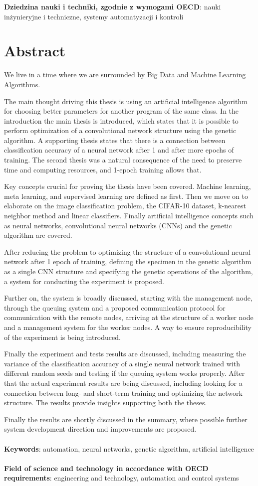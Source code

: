 \noindent
\textbf{Dziedzina nauki i techniki, zgodnie z wymogami OECD}: nauki inżynieryjne i techniczne, systemy automatyzacji i kontroli
\chapter*{Abstract}
We live in a time where we are surrounded by Big Data and Machine Learning Algorithms.

The main thought driving this thesis is using an artificial intelligence algorithm for choosing better parameters for another program of the same class.
In the introduction the main thesis is introduced, which states that it is possible to perform optimization of a convolutional network structure using the genetic algorithm.
A supporting thesis states that there is a connection between classification accuracy of a neural network after 1 and after more epochs of training.
The second thesis was a natural consequence of the need to preserve time and computing resources, and 1-epoch training allows that.

Key concepts crucial for proving the thesis have been covered.
Machine learning, meta learning, and supervised learning are defined as first.
Then we move on to elaborate on the image classification problem, the CIFAR-10 dataset, k-nearest neighbor method and linear classifiers.
Finally artificial intelligence concepts such as neural networks, convolutional neural networks (CNNs) and the genetic algorithm are covered.

After reducing the problem to optimizing the structure of a convolutional neural network after 1 epoch of training, defining the specimen in the genetic algorithm as a single CNN structure and specifying the genetic operations of the algorithm, a system for conducting the experiment is proposed.

Further on, the system is broadly discussed, starting with the management node, through the queuing system and a proposed communication protocol for communication with the remote nodes, arriving at the structure of a worker node and a management system for the worker nodes.
A way to ensure reproducibility of the experiment is being introduced.

Finally the experiment and tests results are discussed, including measuring the variance of the classification accuracy of a single neural network trained with different random seeds and testing if the queuing system works properly.
After that the actual experiment results are being discussed, including looking for a connection between long- and short-term training and optimizing the network structure.
The results provide insights supporting both the theses.

Finally the results are shortly discussed in the summary, where possible further system development direction and improvements are proposed.
 \\\\
\noindent
\textbf{Keywords}: automation, neural networks, genetic algorithm, artificial intelligence\\\\
\noindent
\textbf{Field    of    science    and    technology    in    accordance    with    OECD    requirements}: engineering and technology, automation  and  control  systems
